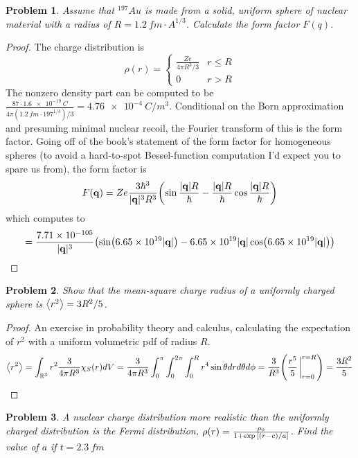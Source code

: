 \documentclass{article}
\newtheorem{plm}{Problem}
\begin{document}
\begin{plm}
  Assume that $^{197}Au$ is made from a solid, uniform sphere of nuclear material with a radius of $R = \SI{1.2}{fm} \cdot A^{1/3}$.
  Calculate the form factor $F(q)$.
\end{plm}

\begin{proof}
  The charge distribution is
  \[
    \rho(r) =
    \begin{cases}
      \frac{Ze}{4\pi R^{3}/3} & r \leq R \\
      0 & r > R
    \end{cases}
  \]
  The nonzero density part can be computed to be $\frac{87 \cdot \SI{1.6e-19}{C}}{4\pi (\SI{1.2}{fm} \cdot 197^{1/3})/3} = \SI{4.76e-4}{C/m^{3}}$.
  Conditional on the Born approximation and presuming minimal nuclear recoil, the Fourier transform of this is the form factor.
  Going off of the book's statement of the form factor for homogeneous spheres
  (to avoid a hard-to-spot Bessel-function computation I'd expect you to spare us from), the form factor is
  \[
    F(\vb{q}) = Ze\frac{3\hbar^{3}}{|\vb{q}|^{3}R^{3}}\qty(\sin\frac{|\vb{q}|R}{\hbar} - \frac{|\vb{q}|R}{\hbar}\cos\frac{|\vb{q}|R}{\hbar})
  \]
  which computes to
  \[
    = \frac{\SI{7.71e-105}{}}{|\vb{q}|^{3}}\qty(\sin(\SI{6.65e19}{}|\vb{q}|) - \SI{6.65e19}{}|\vb{q}| \cos(\SI{6.65e19}{}|\vb{q}|))
\]
\end{proof}

\begin{plm}
  Show that the mean-square charge radius of a uniformly charged sphere is $\expval{r^{2}} = 3R^{2}/5$.
\end{plm}

\begin{proof}
  An exercise in probability theory and calculus, calculating the expectation of $r^{2}$ with a uniform volumetric pdf of radius $R$.
  \[
    \expval{r^{2}} = \int_{\mathbb{R}^{3}}r^{2}\frac{3}{4\pi R^{3}}\chi_{S}(r)dV
    = \frac{3}{4\pi R^{3}}\int_{0}^{\pi}\int_{0}^{2\pi}\int_{0}^{R}r^{4}\sin\theta drd\theta d\phi
    = \frac{3}{R^{3}}\qty(\frac{r^{5}}{5}\eval_{r = 0}^{r = R}) = \frac{3R^{2}}{5}
  \]
\end{proof}

\begin{plm}
  A nuclear charge distribution more realistic than the uniformly charged distribution is the Fermi distribution,
  $\rho(r) = \frac{\rho_{0}}{1 + \exp\qty[(r - c)/a]}$.
  Find the value of $a$ if $t = \SI{2.3}{fm}$
\end{plm}
\end{document}
